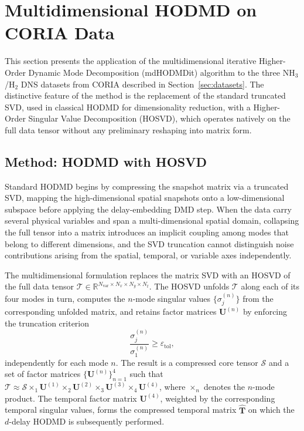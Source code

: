 
\section{Multidimensional HODMD on CORIA Data}
\label{sec:mdhodmd_coria}

This section presents the application of the multidimensional iterative Higher-Order
Dynamic Mode Decomposition (mdHODMDit) algorithm to the three NH$_3$/H$_2$ DNS datasets
from CORIA described in Section~\ref{sec:datasets}.
The distinctive feature of the method is the replacement of the standard truncated SVD,
used in classical HODMD for dimensionality reduction, with a Higher-Order Singular Value
Decomposition (HOSVD), which operates natively on the full data tensor without any
preliminary reshaping into matrix form.

\subsection{Method: HODMD with HOSVD}
\label{sec:method_hosvd}

Standard HODMD begins by compressing the snapshot matrix via a truncated SVD, mapping
the high-dimensional spatial snapshots onto a low-dimensional subspace before applying
the delay-embedding DMD step.
When the data carry several physical variables and span a multi-dimensional spatial domain,
collapsing the full tensor into a matrix introduces an implicit coupling among modes that
belong to different dimensions, and the SVD truncation cannot distinguish noise
contributions arising from the spatial, temporal, or variable axes independently.

The multidimensional formulation replaces the matrix SVD with an HOSVD of the full data
tensor $\mathcal{T} \in \mathbb{R}^{N_{\mathrm{var}} \times N_x \times N_y \times N_t}$.
The HOSVD unfolds $\mathcal{T}$ along each of its four modes in turn, computes the
$n$-mode singular values $\{\sigma_j^{(n)}\}$ from the corresponding unfolded matrix, and
retains factor matrices $\mathbf{U}^{(n)}$ by enforcing the truncation criterion
\begin{equation}
    \frac{\sigma_j^{(n)}}{\sigma_1^{(n)}} \geq \varepsilon_{\mathrm{tol}},
    \label{eq:hosvd_trunc}
\end{equation}
independently for each mode $n$.
The result is a compressed core tensor $\mathcal{S}$ and a set of factor matrices
$\{\mathbf{U}^{(n)}\}_{n=1}^{4}$ such that
$\mathcal{T} \approx \mathcal{S} \times_1 \mathbf{U}^{(1)} \times_2 \mathbf{U}^{(2)}
\times_3 \mathbf{U}^{(3)} \times_4 \mathbf{U}^{(4)}$,
where $\times_n$ denotes the $n$-mode product.
The temporal factor matrix $\mathbf{U}^{(4)}$, weighted by the corresponding temporal
singular values, forms the compressed temporal matrix $\hat{\mathbf{T}}$ on which
the $d$-delay HODMD is subsequently performed.

